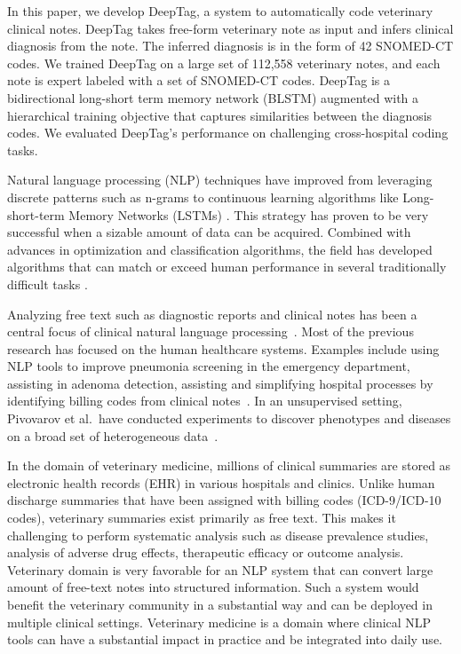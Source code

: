 \documentclass{article}[11pt,oneside]
\begin{document}
In this paper, we develop DeepTag, a system to automatically code veterinary clinical notes. DeepTag takes free-form veterinary note as input and infers clinical diagnosis from the note. The inferred diagnosis is in the form of 42 SNOMED-CT codes. We trained DeepTag on a large set of 112,558 veterinary notes, and each note is expert labeled with a set of SNOMED-CT codes. DeepTag is a bidirectional long-short term memory network (BLSTM) augmented with a hierarchical training objective that captures similarities between the diagnosis codes. We evaluated DeepTag's performance on challenging cross-hospital coding tasks.

Natural language processing (NLP)  techniques have improved from leveraging discrete patterns such as n-grams \cite{jurafsky2014speech} to continuous learning algorithms like Long-short-term Memory Networks (LSTMs) \cite{hochreiter1997long}. This strategy has proven to be very successful when a sizable amount of data can be acquired. Combined with advances in optimization and classification algorithms, the field has developed algorithms that can match or exceed human performance in several traditionally difficult tasks \cite{goldberg2017neural}.

Analyzing free text such as diagnostic reports and clinical notes has been a central focus of clinical natural language processing~\cite{velupillai2015recent}. Most of the previous research has focused on the human healthcare systems. Examples include using NLP tools to improve pneumonia screening in the emergency department, assisting in adenoma detection, assisting and simplifying hospital processes by identifying billing codes from clinical notes~\cite{demner2016aspiring}. In an unsupervised setting, Pivovarov et al.~have conducted experiments to discover phenotypes and diseases on a broad set of heterogeneous data~\cite{pivovarov2015learning}.

In the domain of veterinary medicine, millions of clinical summaries are stored as electronic health records (EHR) in various hospitals and clinics. Unlike human discharge summaries that have been assigned with billing codes (ICD-9/ICD-10 codes), veterinary summaries exist primarily as free text. This makes it challenging to perform  systematic analysis  such as disease prevalence studies, analysis of adverse drug effects, therapeutic efficacy or outcome analysis. Veterinary domain is very favorable for an NLP system that can convert large amount of  free-text notes into structured information. Such a system would benefit the veterinary community in a substantial way and can be deployed in multiple clinical settings. Veterinary medicine is a domain where clinical NLP tools can have a substantial impact in practice and be integrated into daily use.
\end{document}
